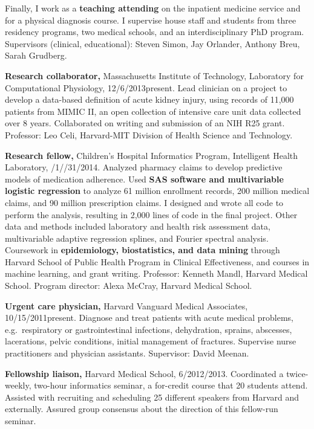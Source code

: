 \documentclass[10pt]{article}
\begin{document}
Finally, I work as a \textbf{teaching attending} on the inpatient medicine
service and for a physical diagnosis course. I supervise house staff
and students from three residency programs, two medical schools, and
an interdisciplinary PhD program. Supervisors (clinical, educational):
Steven Simon, Jay Orlander, Anthony Breu, Sarah Grudberg.

\textbf{Research collaborator,} Massachusetts Institute of Technology,
Laboratory for Computational Physiology,
12/6/2013\ndash{}\linebreak[0]present. Lead clinician on a project to
develop a data-based definition of acute kidney injury, using records
of 11,000 patients from MIMIC II, an open collection of intensive care
unit data collected over 8 years. Collaborated on writing and
submission of an NIH R25 grant. Professor: Leo Celi, Harvard-MIT
Division of Health Science and Technology.

\textbf{Research fellow,} Children’s Hospital Informatics Program,
Intelligent Health Lab\-o\-ra\-to\-ry,
/1/\ndash{}/31/2014.
Analyzed pharmacy claims to develop predictive models of medication
adherence. Used \textbf{SAS software and multivariable logistic
  regression} to analyze 61 million enrollment records, 200 million
medical claims, and 90 million prescription claims. I designed and
wrote all code to perform the analysis, resulting in 2,000 lines of
code in the final project. Other data and methods included laboratory
and health risk assessment data, multivariable adaptive regression
splines, and Fourier spectral analysis. Coursework in
\textbf{epidemiology, biostatistics, and data mining} through Harvard
School of Public Health Program in Clinical Effectiveness, and courses
in machine learning, and grant writing. Professor: Kenneth Mandl,
Harvard Medical School. Program director: Alexa McCray, Harvard
Medical School.

\textbf{Urgent care physician,} Harvard Vanguard Medical Associates,
10/15/2011\ndash{}present. Diagnose and treat patients with acute
medical problems, e.g.\ respiratory or gastrointestinal infections,
dehydration, sprains, abscesses, lacerations, pelvic conditions,
initial management of fractures. Supervise nurse practitioners and
physician assistants. Supervisor: David Meenan.

\textbf{Fellowship liaison,} Harvard Medical School,
6/2012/2013. Coordinated a twice-week\-ly, two-hour informatics
seminar, a for-credit course that 20 students attend. Assisted with
recruiting and scheduling 25 different speakers from Harvard and
externally. Assured group consensus about the direction of this
fellow-run seminar.
\end{document}
